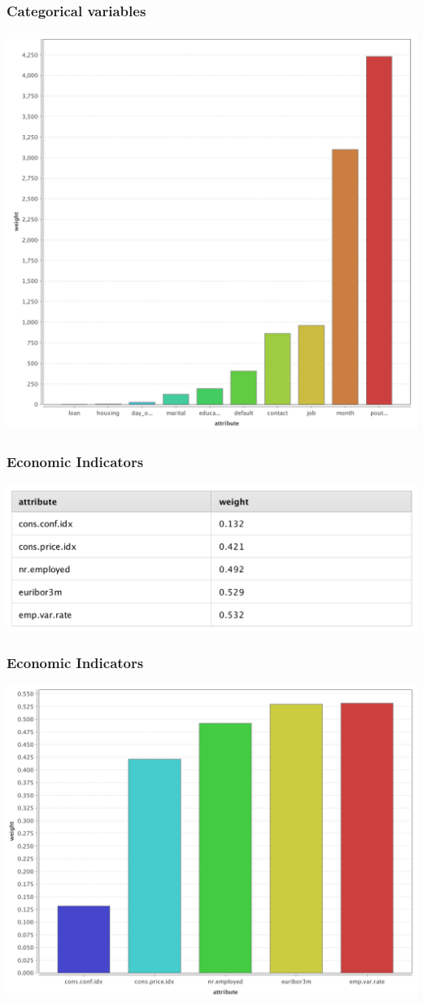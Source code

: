 \documentclass{beamer}
\begin{document}
\begin{frame}
	\frametitle{Categorical variables}
  \includegraphics[width=\textwidth,height=\textheight,keepaspectratio]{chi-squared}
\end{frame}

\begin{frame}
	\frametitle{Economic Indicators}
  \includegraphics[width=\textwidth,height=\textheight,keepaspectratio]{pca-table}
\end{frame}

\begin{frame}
	\frametitle{Economic Indicators}
  \includegraphics[width=\textwidth,height=\textheight,keepaspectratio]{pca}
\end{frame}
\end{document}
